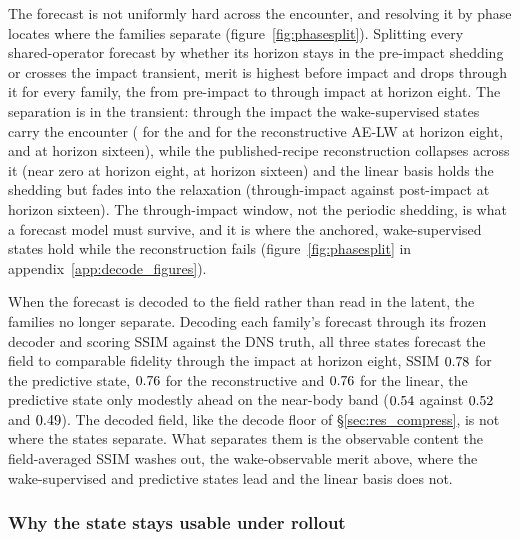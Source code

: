 The forecast is not uniformly hard across the encounter, and resolving it by phase locates where the families separate (figure~\ref{fig:phasesplit}). Splitting every shared-operator forecast by whether its horizon stays in the pre-impact shedding or crosses the impact transient, merit is highest before impact and drops through it for every family, the \PredState{} from \PhaseJepaPreEight{} pre-impact to \PhaseJepaThruEight{} through impact at horizon eight. The separation is in the transient: through the impact the wake-supervised states carry the encounter (\PhaseJepaThruEight{} for the \PredState{} and \PhaseAeThruEight{} for the reconstructive AE-LW at horizon eight, \PhaseJepaThruSixteen{} and \PhaseAeThruSixteen{} at horizon sixteen), while the published-recipe reconstruction collapses across it (near zero at horizon eight, \PhaseFukamiThruSixteen{} at horizon sixteen) and the linear basis holds the shedding but fades into the relaxation (through-impact \PhasePodThruSixteen{} against post-impact \PhasePodPostSixteen{} at horizon sixteen). The through-impact window, not the periodic shedding, is what a forecast model must survive, and it is where the anchored, wake-supervised states hold while the reconstruction fails (figure~\ref{fig:phasesplit} in appendix~\ref{app:decode_figures}).\re

When the forecast is decoded to the field rather than read in the latent, the families no longer separate. Decoding each family's forecast through its frozen decoder and scoring SSIM against the DNS truth, all three states forecast the field to comparable fidelity through the impact at horizon eight, SSIM $0.78$ for the predictive state, $0.76$ for the reconstructive and $0.76$ for the linear, the predictive state only modestly ahead on the near-body band ($0.54$ against $0.52$ and $0.49$). The decoded field, like the decode floor of \S\ref{sec:res_compress}, is not where the states separate. What separates them is the observable content the field-averaged SSIM washes out, the wake-observable merit above, where the wake-supervised and predictive states lead and the linear basis does not.\re

\subsubsection{Why the state stays usable under rollout}
\label{sec:res_rollout}
\label{sec:res_controls} %
\label{sec:res_horizon} %
\label{sec:res_drift} %

